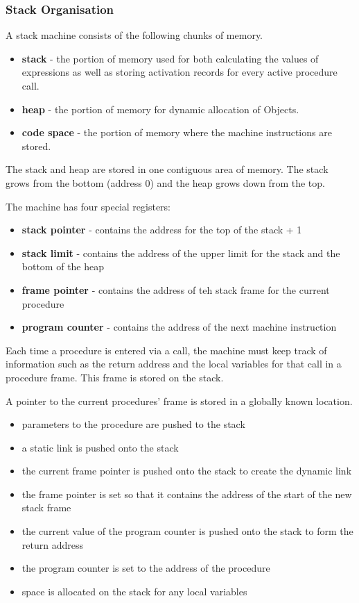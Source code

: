 \subsubsection{Stack Organisation}
A stack machine consists of the following chunks of memory.
\begin{itemize}
    \item \textbf{stack} - the portion of memory used for both calculating the values of 
    expressions as well as storing activation records for every active procedure call.
    \item \textbf{heap} - the portion of memory for dynamic allocation of Objects.
    \item \textbf{code space} - the portion of memory where the machine instructions are 
    stored.
\end{itemize}
The stack and heap are stored in one contiguous area of memory. The stack grows from the 
bottom (address 0) and the heap grows down from the top.

The machine has four special registers:
\begin{itemize}
    \item \textbf{stack pointer} - contains the address for the top of the stack + 1
    \item \textbf{stack limit} - contains the address of the upper limit for the stack 
    and the bottom of the heap
    \item \textbf{frame pointer} - contains the address of teh stack frame for the 
    current procedure
    \item \textbf{program counter} - contains the address of the next machine instruction
\end{itemize}

Each time a procedure is entered via a call, the machine must keep track of information 
such as the return address and the local variables for that call in a procedure frame. 
This frame is stored on the stack.

A pointer to the current procedures' frame is stored in a globally known location.
\begin{itemize}
    \item parameters to the procedure are pushed to the stack
    \item a static link is pushed onto the stack
    \item the current frame pointer is pushed onto the stack to create the dynamic link
    \item the frame pointer is set so that it contains the address of the start of the 
    new stack frame
    \item the current value of the program counter is pushed onto the stack to form the 
    return address
    \item the program counter is set to the address of the procedure
    \item space is allocated on the stack for any local variables
\end{itemize}
\begin{center}
\end{center}

